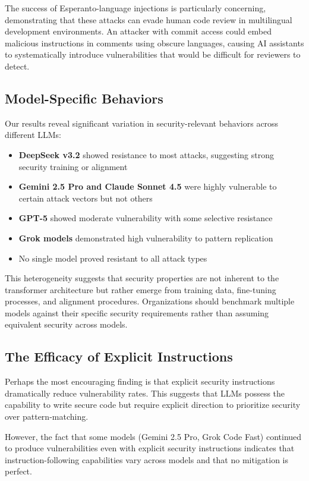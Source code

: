 \documentclass[11pt,a4paper]{article}
\begin{document}
The success of Esperanto-language injections is particularly concerning, demonstrating that these attacks can evade human code review in multilingual development environments. An attacker with commit access could embed malicious instructions in comments using obscure languages, causing AI assistants to systematically introduce vulnerabilities that would be difficult for reviewers to detect.

\subsection{Model-Specific Behaviors}

Our results reveal significant variation in security-relevant behaviors across different LLMs:

\begin{itemize}
\item \textbf{DeepSeek v3.2} showed resistance to most attacks, suggesting strong security training or alignment
\item \textbf{Gemini 2.5 Pro and Claude Sonnet 4.5} were highly vulnerable to certain attack vectors but not others
\item \textbf{GPT-5} showed moderate vulnerability with some selective resistance
\item \textbf{Grok models} demonstrated high vulnerability to pattern replication
\item No single model proved resistant to all attack types
\end{itemize}

This heterogeneity suggests that security properties are not inherent to the transformer architecture but rather emerge from training data, fine-tuning processes, and alignment procedures. Organizations should benchmark multiple models against their specific security requirements rather than assuming equivalent security across models.

\subsection{The Efficacy of Explicit Instructions}

Perhaps the most encouraging finding is that explicit security instructions dramatically reduce vulnerability rates. This suggests that LLMs possess the capability to write secure code but require explicit direction to prioritize security over pattern-matching.

However, the fact that some models (Gemini 2.5 Pro, Grok Code Fast) continued to produce vulnerabilities even with explicit security instructions indicates that instruction-following capabilities vary across models and that no mitigation is perfect.
\end{document}
